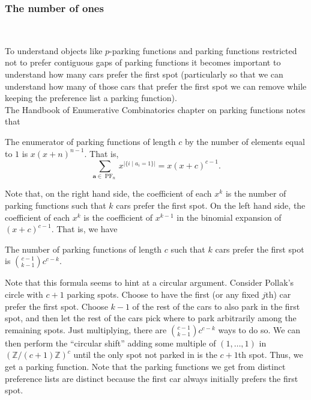 \subsubsection*{The number of ones}\label{sss: no.ones}~

To understand objects like $p$-parking functions and parking functions restricted not to prefer contiguous gaps of parking functions it becomes important to understand how many cars prefer the first spot (particularly so that we can understand how many of those cars that prefer the first spot we can remove while keeping the preference list a parking function). \\

The Handbook of Enumerative Combinatorics chapter on parking functions notes that
\begin{proposition}
	The enumerator of parking functions of length $c$ by the number of elements equal to $1$ is $x(x + n)^{n - 1}$. That is,
	\[
		\sum_{\mathbf{a} \in \operatorname{PF}_{n}} x^{\lvert \{ i \mid a_{i} = 1 \} \rvert} =x(x + c)^{c - 1}.
	\]
\end{proposition}

Note that, on the right hand side, the coefficient of each $x^{k}$ is the number of parking functions such that $k$ cars prefer the first spot. On the left hand side, the coefficient of each $x^{k}$ is the coefficient of $x^{k - 1}$ in the binomial expansion of $(x + c)^{c - 1}$. That is, we have

\begin{corollary}
	The number of parking functions of length $c$ such that $k$ cars prefer the first spot is $\binom{c - 1}{k - 1} c^{c - k}$.
\end{corollary}

Note that this formula seems to hint at a circular argument. Consider Pollak's circle with $c + 1$ parking spots. Choose to have the first (or any fixed $j$th) car prefer the first spot. Choose $k - 1$ of the rest of the cars to also park in the first spot, and then let the rest of the cars pick where to park arbitrarily among the remaining spots. Just multiplying, there are $\binom{c - 1}{k - 1} c^{c - k}$ ways to do so. We can then perform the ``circular shift'' adding some multiple of $(1, \dots, 1)$ in $(\mathbb{Z}/(c + 1)\mathbb{Z})^{c}$ until the only spot not parked in is the $c + 1$th spot. Thus, we get a parking function. Note that the parking functions we get from distinct preference lists are distinct because the first car always initially prefers the first spot. \\

